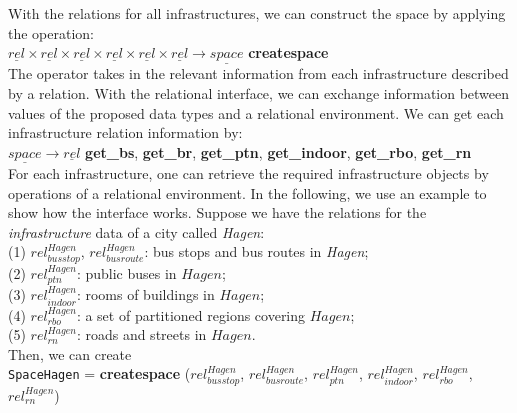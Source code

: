 With the relations for all infrastructures, we can construct the space by applying the operation: \\

$\underline{rel} \times \underline{rel} \times \underline{rel} \times \underline{rel} \times \underline{rel} \times \underline{rel} \rightarrow \underline{space}$ \hspace{1cm} \textbf{createspace}\\

The operator takes in the relevant information from each infrastructure described by a relation.
With the relational interface, we can exchange information between values of the proposed data types and a relational environment. We can get each infrastructure relation information by: \\

$\underline{space} \rightarrow \underline{rel}$ \hspace{1cm} \textbf{get\_bs}, \textbf{get\_br}, \textbf{get\_ptn}, \textbf{get\_indoor}, \textbf{get\_rbo}, \textbf{get\_rn} \\

For each infrastructure, one can retrieve the required infrastructure objects by operations of a relational environment. In the following, we use an example to show how the interface works. Suppose we have the relations for the \textit{infrastructure} data of a city called \textit{Hagen}: \\


(1) $rel_{busstop}^{Hagen}$, $rel_{busroute}^{Hagen}$: bus stops and bus routes in \textit{Hagen}; \\

(2) $rel_{ptn}^{Hagen}$: public buses in $Hagen$; \\

(3) $rel_{indoor}^{Hagen}$: rooms of buildings in $Hagen$;  \\

(4) $rel_{rbo}^{Hagen}$: a set of partitioned regions covering $Hagen$; \\

(5) $rel_{rn}^{Hagen}$: roads and streets in $Hagen$. \\

Then, we can create \\

\texttt{SpaceHagen} = \textbf{createspace} ($rel_{busstop}^{Hagen}$, $rel_{busroute}^{Hagen}$, $rel_{ptn}^{Hagen}$, $rel_{indoor}^{Hagen}$, $rel_{rbo}^{Hagen}$, $rel_{rn}^{Hagen}$) \\


